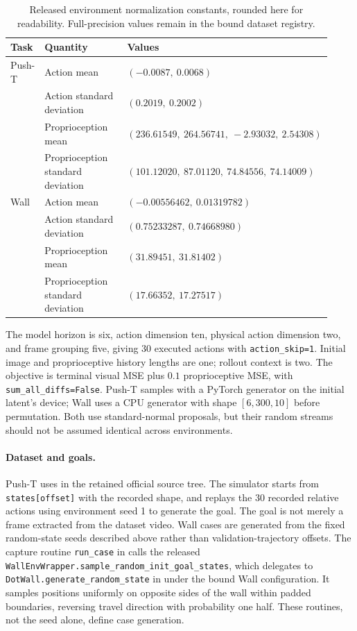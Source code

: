 \documentclass{article}
\begin{document}
\begin{table}[h]
\caption{Released environment normalization constants, rounded here for
readability. Full-precision values remain in the bound dataset registry.}
\label{tab:normalization}
\centering\small
\begin{tabular}{@{}p{0.10\linewidth}p{0.32\linewidth}p{0.50\linewidth}@{}}
\toprule
Task & Quantity & Values\\
\midrule
Push-T & Action mean & $(-0.0087,\ 0.0068)$\\
 & Action standard deviation & $(0.2019,\ 0.2002)$\\
 & Proprioception mean & $(236.61549,\ 264.56741,\ -2.93032,\ 2.54308)$\\
 & Proprioception standard deviation & $(101.12020,\ 87.01120,\ 74.84556,\ 74.14009)$\\
Wall & Action mean & $(-0.00556462,\ 0.01319782)$\\
 & Action standard deviation & $(0.75233287,\ 0.74668980)$\\
 & Proprioception mean & $(31.89451,\ 31.81402)$\\
 & Proprioception standard deviation & $(17.66352,\ 17.27517)$\\
\bottomrule
\end{tabular}
\end{table}

The model horizon is six, action dimension ten, physical action dimension two,
and frame grouping five, giving 30 executed actions with
\texttt{action\_skip=1}. Initial image and proprioceptive history lengths are
one; rollout context is two. The objective is terminal visual MSE plus
$0.1$ proprioceptive MSE, with \texttt{sum\_all\_diffs=False}.
Push-T samples with a PyTorch generator on the initial latent's device;
Wall uses a CPU generator with shape $[6,300,10]$ before permutation.
Both use standard-normal proposals, but their random streams should not be
assumed identical across environments.

\paragraph{Dataset and goals.}
Push-T uses  in the retained official source tree.
The simulator starts from \texttt{states[offset]} with the recorded shape,
and replays the 30 recorded relative actions using environment seed 1 to
generate the goal. The goal is not merely a frame extracted from the dataset
video. Wall cases are generated from the fixed random-state seeds described
above rather than validation-trajectory offsets. The capture routine
\texttt{run\_case} in  calls the released
\texttt{WallEnvWrapper.sample\_random\_init\_goal\_states}, which delegates to
\texttt{DotWall.generate\_random\_state} in
 under the bound
Wall configuration. It samples positions uniformly on opposite sides of the
wall within padded boundaries, reversing travel direction with probability
one half. These routines, not the seed alone, define case generation.
\end{document}
